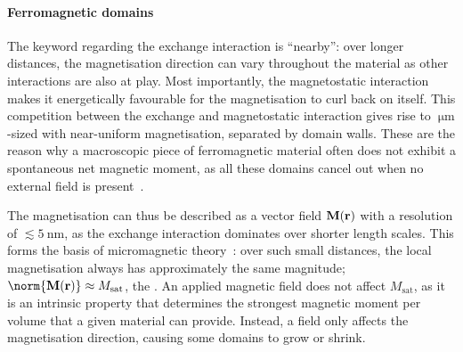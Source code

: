 \paragraph{Ferromagnetic domains}
The keyword regarding the exchange interaction is ``nearby'': over longer distances, the magnetisation direction can vary throughout the material as other interactions are also at play.
Most importantly, the magnetostatic interaction makes it energetically favourable for the magnetisation to curl back on itself. %
This competition between the exchange and magnetostatic interaction gives rise to $\SI{}{\micro\metre}$-sized  with near-uniform magnetisation, separated by domain walls.
These are the reason why a macroscopic piece of ferromagnetic material often does not exhibit a spontaneous net magnetic moment, as all these domains cancel out when no external field is present~\cite{coey2010magnetism}. \par
The magnetisation can thus be described as a vector field $\boldsymbol{\mathbf{M}}(\boldsymbol{\mathbf{r}})$ with a resolution of $\lesssim \SI{5}{\nano\metre}$, as the exchange interaction dominates over shorter length scales.
This forms the basis of micromagnetic theory~\cite{mumax3}: over such small distances, the local magnetisation always has approximately the same magnitude; $\norm{\vc{M}(\vc{r})} \approx M_\mathrm{sat}$, the .
An applied magnetic field does not affect $M_\mathrm{sat}$, as it is an intrinsic property that determines the strongest magnetic moment per volume that a given material can provide.
Instead, a field only affects the magnetisation direction, causing some domains to grow or shrink.

